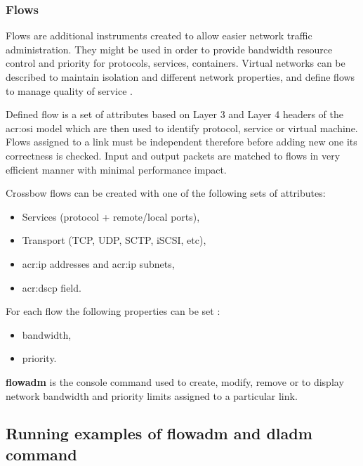 \documentclass[11pt]{book}
\begin{document}
        \subsubsection{Flows}

          Flows are additional instruments created to allow easier network traffic administration. They might be used in
          order to provide bandwidth resource control and priority for protocols, services, containers. Virtual networks
          can be described to maintain isolation and different network properties, and define flows to manage quality of
          service \cite{network_virtualization}.

          Defined flow is a set of attributes based on Layer 3 and Layer 4 headers of the \gls{acr:osi} model which are
          then used to identify protocol, service or virtual machine. Flows assigned to a link must be independent
          therefore before adding new one its correctness is checked. Input and output packets are matched to flows in
          very efficient manner with minimal performance impact.

          \medskip

          Crossbow flows can be created with one of the following sets of attributes:

          \begin{itemize}
            \item Services (protocol + remote/local ports),
            \item Transport (TCP, UDP, SCTP, iSCSI, etc),
            \item \gls{acr:ip} addresses and \gls{acr:ip} subnets,
            \item \gls{acr:dscp} field.
          \end{itemize}

          For each flow the following properties can be set \cite{flows2}: 

          \begin{itemize}
            \item bandwidth,
            \item priority.
          \end{itemize}

          \textbf{flowadm} is the console command used to create, modify, remove or to display network bandwidth and
          priority limits assigned to a particular link. 


      \subsection{Running examples of flowadm and dladm command}
\end{document}
